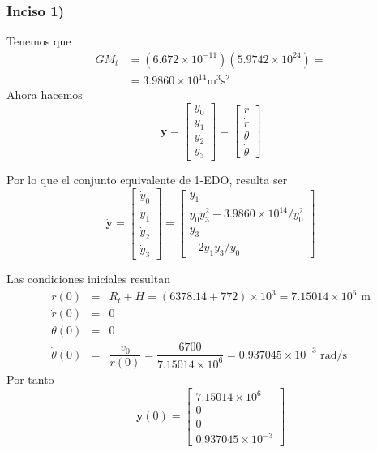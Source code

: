\begin{frame}
\frametitle{Inciso 1)}
Tenemos que
\[ \begin{split} G M_{t} &= (6.672 \times 10^{-11}) (5.9742 \times 10^{24})  = \\
 &= 3.9860 \times 10^{14} \mbox{m}^{3} \mbox{s}^{2} \end{split} \]
Ahora hacemos
\[ \mathbf{y} = \begin{bmatrix}
y_{0} \\
y_{1} \\
y_{2} \\
y_{3}
\end{bmatrix} =
\begin{bmatrix}
r \\
\dot{r} \\
\theta \\
\dot{\theta}
\end{bmatrix}
\]
\end{frame}
\begin{frame}
Por lo que el conjunto equivalente de 1-EDO, resulta ser
\[ \dot{\mathbf{y}} = \begin{bmatrix}
\dot{y}_{0} \\
\dot{y}_{1} \\
\dot{y}_{2} \\
\dot{y}_{3}
\end{bmatrix} =
\begin{bmatrix}
y_{1} \\
y_{0} y_{3}^{2} - 3.9860 \times 10^{14}/y_{0}^{2} \\
y_{3} \\
-2 y_{1} y_{3} / y_{0}
\end{bmatrix} \]
\end{frame}
\begin{frame}
Las condiciones iniciales resultan
\fontsize{12}{12}\selectfont
\begin{eqnarray*}
r(0) &=& R_{t} + H = (6378.14+772) \times 10^{3} = 7.15014 \times 10^{6} \mbox{ m} \\
\dot{r}(0) &=& 0 \\
\theta(0) &=& 0 \\
\dot{\theta}(0) &=& \dfrac{v_{0}}{r(0)} = \dfrac{6700}{7.15014 \times 10^{6}} = 0.937045 \times 10^{-3} \mbox{ rad/s}
\end{eqnarray*}
\fontsize{14}{14}\selectfont
Por tanto
\[ \mathbf{y}(0) = 
\begin{bmatrix}
7.15014 \times 10^{6} \\
0 \\
0 \\
0.937045 \times 10^{-3}
\end{bmatrix}
\]
\end{frame}
